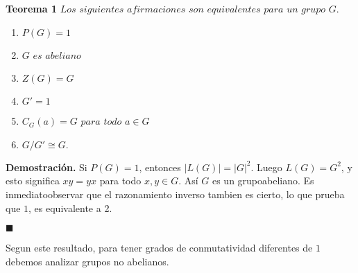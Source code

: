 \documentclass[¨12pt,letter paper]{article}
\begin{document}
        
          \textbf{Teorema 1} $Los$ $siguientes$ $ afirmaciones$ $ son$ $ equivalentes$ $ para$ $ un$ $ grupo $ $G.$
                  \begin{multicols}{2}
                         \begin{enumerate}
                             \item $P(G)=1$ 
                              \item $G$ $es$ $abeliano$
                               \item $Z(G)=G$
                                \item $G'={1}$
                                 \item $C_G(a)=G$ $para$ $todo$ $a\in G$
                                  \item $G/G'\cong G.$                                  
                         \end{enumerate}
                   \end{multicols}  
         \textbf{Demostración.} Si $P(G)=1$, entonces $|L(G)|=|G|^2$. Luego $L(G)=G^2$, y esto significa $xy=yx$ para todo $x,y \in G$. Así $G$ es un grupoabeliano. Es inmediatoobservar que el razonamiento inverso tambien es cierto, lo que prueba que $1$, es equivalente a 2.
            \begin{flushright}
                  \textbf{\(\blacksquare\)}
            \end{flushright}
          \hspace{1 cm}Segun este resultado, para tener grados de conmutatividad diferentes de $1$ debemos analizar grupos no abelianos.
                
\end{document}
